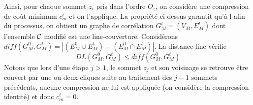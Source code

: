 Ainsi, pour chaque sommet $z_i$ pris dans l'ordre $O_z$, on consid\`ere une compression de co\^ut minimum $c_m^i$ et on l'applique.
La propri\'et\'e ci-dessus garantit qu'\`a l afin du processus, on obtient un graphe de corr\'elation $G_M^t = (V_M, E_M^t)$ dont l'ensemble $\cal C$ modifi\'e est une line-couverture.
Consid\'erons $diff(G_M^0, G_M^t ) = | (E_M^0 \cup E_M^t)  - (E_M^0 \cap E_M^t) |$.
La distance-line v\'erifie  
$$DL( G_{M}^{0}, G_{M}^{t}) \le  diff(G_M^0, G_M^t ) $$
Notons que lors d'une \'etape $j > 1$, le sommet $z_j$ et son voisinage se retrouve \^etre couvert par une ou deux cliques suite au traitement des $j-1$ sommets pr\'ec\'edents, aucune compression ne lui est appliqu\'ee (on consid\`ere la compression identit\'e) et donc 
$c_{m}^{i} = 0$.